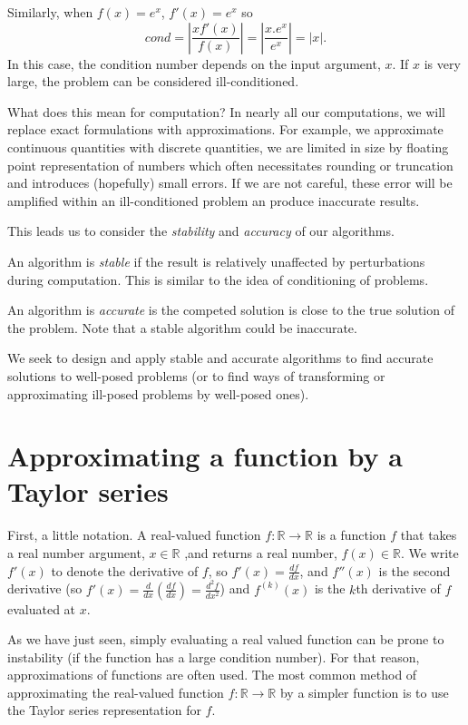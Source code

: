 Similarly, when $f(x) = e^x$, $f'(x) = e^x$ so \[ cond =  \left | \frac{x f'(x)}{f(x)} \right | = \left | \frac{x .e^x}{e^x} \right |  = |x|.\]
In this case, the condition number depends on the input argument, $x$.  If $x$ is very large, the problem can be considered ill-conditioned.   \sqend




What does this mean for computation?  In nearly all our computations, we will replace  exact formulations with approximations.  For example,  we approximate continuous quantities with discrete quantities, we are limited in size by floating point representation of numbers which often necessitates rounding or truncation and introduces (hopefully) small errors.  If we are not careful, these error will be amplified within an ill-conditioned problem an produce inaccurate results.

This leads us to consider the {\em stability}   and {\em accuracy} of our algorithms.   

An algorithm is {\em stable} if the result is relatively unaffected by perturbations during computation.  This is similar to the idea of conditioning of problems.  

An algorithm is {\em accurate} is the competed solution is close to the true solution of the problem.  Note that a stable algorithm could be inaccurate. 

We seek to design and apply stable and accurate algorithms to find accurate solutions to well-posed problems (or to find ways of transforming or approximating ill-posed problems by well-posed ones).



\section{Approximating a function by a Taylor series}

First, a little notation.  A real-valued function  $f:\mathbb R \to \mathbb R$ is a function  $f$ that  takes a real number argument, $x  \in \mathbb R$ ,and returns a real number, $f(x) \in \mathbb R$. We write $f'(x)$ to denote the derivative of $f$, so $f'(x) = \frac {df}{dx}$, and $f''(x)$ is the second derivative (so  $f'(x) = \frac{d}{dx}(\frac {df}{dx}) = \frac{d^2 f}{dx^2}$) and $f^{(k)}(x)$ is the $k$th derivative of $f$ evaluated at $x$.

As we have just seen, simply evaluating a real valued function can be prone to instability (if the function has a large condition number).  For that reason, approximations of functions are often used.   The most common method of approximating the real-valued function $f:\mathbb R \to \mathbb R$  by a simpler function is to use the Taylor series representation for $f$.  

